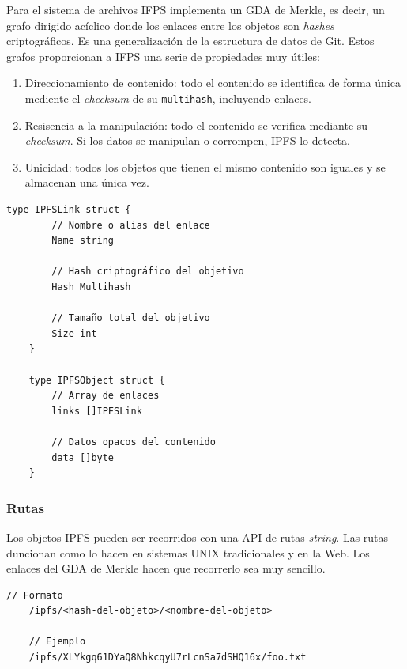 \documentclass[12pt]{article} %
\begin{document}
Para el sistema de archivos IFPS implementa un GDA de Merkle, es decir, un grafo dirigido acíclico donde los enlaces entre los objetos son \textit{hashes} criptográficos. Es una generalización de la estructura de datos de Git. Estos grafos proporcionan a IFPS una serie de propiedades muy útiles:
\begin{enumerate}
	\item Direccionamiento de contenido: todo el contenido se identifica de forma única mediente el \textit{checksum} de su \texttt{multihash}, incluyendo enlaces.
	\item Resisencia a la manipulación: todo el contenido se verifica mediante su \textit{checksum}. Si los datos se manipulan o corrompen, IPFS lo detecta.
	\item Unicidad: todos los objetos que tienen el mismo contenido son iguales y se almacenan una única vez.
\end{enumerate}

\begin{lstlisting}[caption={Implementación de los objetos IPFS.}, language=Golang]
	type IPFSLink struct {
		// Nombre o alias del enlace
		Name string

		// Hash criptográfico del objetivo
		Hash Multihash

		// Tamaño total del objetivo
		Size int
	}

	type IPFSObject struct {
		// Array de enlaces
		links []IPFSLink

		// Datos opacos del contenido
		data []byte
	}
\end{lstlisting}

\subsubsection{Rutas} %
\label{ssub:rutas}

Los objetos IPFS pueden ser recorridos con una API de rutas \textit{string}. Las rutas duncionan como lo hacen en sistemas UNIX tradicionales y en la Web. Los enlaces del GDA de Merkle hacen que recorrerlo sea muy sencillo.

\begin{lstlisting}[caption={Rutas en IPFS.}]
	// Formato
	/ipfs/<hash-del-objeto>/<nombre-del-objeto>

	// Ejemplo
	/ipfs/XLYkgq61DYaQ8NhkcqyU7rLcnSa7dSHQ16x/foo.txt
\end{lstlisting}


\end{document}
